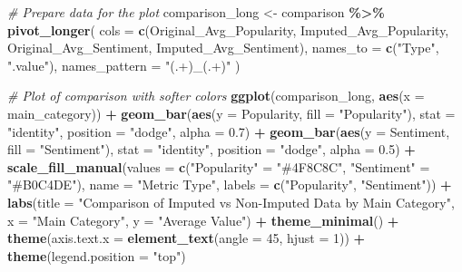\documentclass[
]{article}
\newenvironment{Shaded}{\begin{snugshade}}{\end{snugshade}}
\newcommand{\AttributeTok}[1]{\textcolor[rgb]{0.13,0.29,0.53}{#1}}
\newcommand{\CommentTok}[1]{\textcolor[rgb]{0.56,0.35,0.01}{\textit{#1}}}
\newcommand{\DecValTok}[1]{\textcolor[rgb]{0.00,0.00,0.81}{#1}}
\newcommand{\FloatTok}[1]{\textcolor[rgb]{0.00,0.00,0.81}{#1}}
\newcommand{\FunctionTok}[1]{\textcolor[rgb]{0.13,0.29,0.53}{\textbf{#1}}}
\newcommand{\NormalTok}[1]{#1}
\newcommand{\OtherTok}[1]{\textcolor[rgb]{0.56,0.35,0.01}{#1}}
\newcommand{\SpecialCharTok}[1]{\textcolor[rgb]{0.81,0.36,0.00}{\textbf{#1}}}
\newcommand{\StringTok}[1]{\textcolor[rgb]{0.31,0.60,0.02}{#1}}
\begin{document}
\begin{Shaded}
\begin{Highlighting}[]
\CommentTok{\# Prepare data for the plot}
\NormalTok{comparison\_long }\OtherTok{\textless{}{-}}\NormalTok{ comparison }\SpecialCharTok{\%\textgreater{}\%}
  \FunctionTok{pivot\_longer}\NormalTok{(}
    \AttributeTok{cols =} \FunctionTok{c}\NormalTok{(Original\_Avg\_Popularity, Imputed\_Avg\_Popularity, Original\_Avg\_Sentiment, Imputed\_Avg\_Sentiment),}
    \AttributeTok{names\_to =} \FunctionTok{c}\NormalTok{(}\StringTok{"Type"}\NormalTok{, }\StringTok{".value"}\NormalTok{),}
    \AttributeTok{names\_pattern =} \StringTok{"(.+)\_(.+)"}
\NormalTok{  )}

\CommentTok{\# Plot of comparison with softer colors}
\FunctionTok{ggplot}\NormalTok{(comparison\_long, }\FunctionTok{aes}\NormalTok{(}\AttributeTok{x =}\NormalTok{ main\_category)) }\SpecialCharTok{+}
  \FunctionTok{geom\_bar}\NormalTok{(}\FunctionTok{aes}\NormalTok{(}\AttributeTok{y =}\NormalTok{ Popularity, }\AttributeTok{fill =} \StringTok{"Popularity"}\NormalTok{), }\AttributeTok{stat =} \StringTok{"identity"}\NormalTok{, }\AttributeTok{position =} \StringTok{"dodge"}\NormalTok{, }\AttributeTok{alpha =} \FloatTok{0.7}\NormalTok{) }\SpecialCharTok{+}
  \FunctionTok{geom\_bar}\NormalTok{(}\FunctionTok{aes}\NormalTok{(}\AttributeTok{y =}\NormalTok{ Sentiment, }\AttributeTok{fill =} \StringTok{"Sentiment"}\NormalTok{), }\AttributeTok{stat =} \StringTok{"identity"}\NormalTok{, }\AttributeTok{position =} \StringTok{"dodge"}\NormalTok{, }\AttributeTok{alpha =} \FloatTok{0.5}\NormalTok{) }\SpecialCharTok{+}
  \FunctionTok{scale\_fill\_manual}\NormalTok{(}\AttributeTok{values =} \FunctionTok{c}\NormalTok{(}\StringTok{"Popularity"} \OtherTok{=} \StringTok{"\#4F8C8C"}\NormalTok{, }\StringTok{"Sentiment"} \OtherTok{=} \StringTok{"\#B0C4DE"}\NormalTok{), }
                    \AttributeTok{name =} \StringTok{"Metric Type"}\NormalTok{, }
                    \AttributeTok{labels =} \FunctionTok{c}\NormalTok{(}\StringTok{"Popularity"}\NormalTok{, }\StringTok{"Sentiment"}\NormalTok{)) }\SpecialCharTok{+}
  \FunctionTok{labs}\NormalTok{(}\AttributeTok{title =} \StringTok{"Comparison of Imputed vs Non{-}Imputed Data by Main Category"}\NormalTok{,}
       \AttributeTok{x =} \StringTok{"Main Category"}\NormalTok{,}
       \AttributeTok{y =} \StringTok{"Average Value"}\NormalTok{) }\SpecialCharTok{+}
  \FunctionTok{theme\_minimal}\NormalTok{() }\SpecialCharTok{+}
  \FunctionTok{theme}\NormalTok{(}\AttributeTok{axis.text.x =} \FunctionTok{element\_text}\NormalTok{(}\AttributeTok{angle =} \DecValTok{45}\NormalTok{, }\AttributeTok{hjust =} \DecValTok{1}\NormalTok{)) }\SpecialCharTok{+}
  \FunctionTok{theme}\NormalTok{(}\AttributeTok{legend.position =} \StringTok{"top"}\NormalTok{)}
\end{Highlighting}
\end{Shaded}
\end{document}
